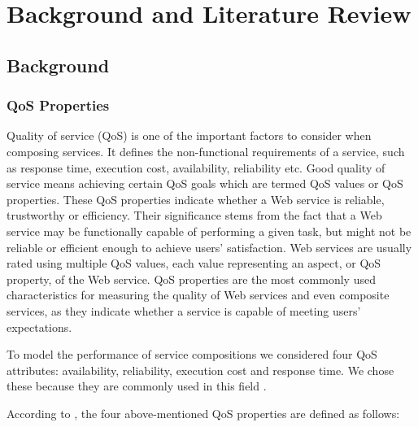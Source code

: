\chapter{Background and Literature Review}\label{C:ex}
\section{Background}
\subsection{QoS Properties}
Quality of service (QoS) is one of the important factors to consider when composing services. It defines the non-functional requirements of a service, such as response time, execution cost, availability, reliability etc. Good quality of service means achieving certain QoS goals which are termed QoS values or QoS properties. These QoS properties indicate whether a Web service is reliable, trustworthy or efficiency. Their significance stems from the fact that a Web service may be functionally capable of performing a given task, but might not be reliable or efficient enough to achieve users' satisfaction. Web services are usually rated using multiple QoS values, each value representing an aspect, or QoS property, of the Web service. QoS properties are the most commonly used characteristics for measuring the quality of Web services and even composite services, as they indicate whether a service is capable of meeting users' expectations.\par

To model the performance of service compositions we considered four QoS attributes: availability, reliability, execution cost and response time. We chose these because they are commonly used in this field \cite{4,14,15,16}. \par
According to \cite{4,11,18}, the four above-mentioned QoS properties are defined as follows:\par

